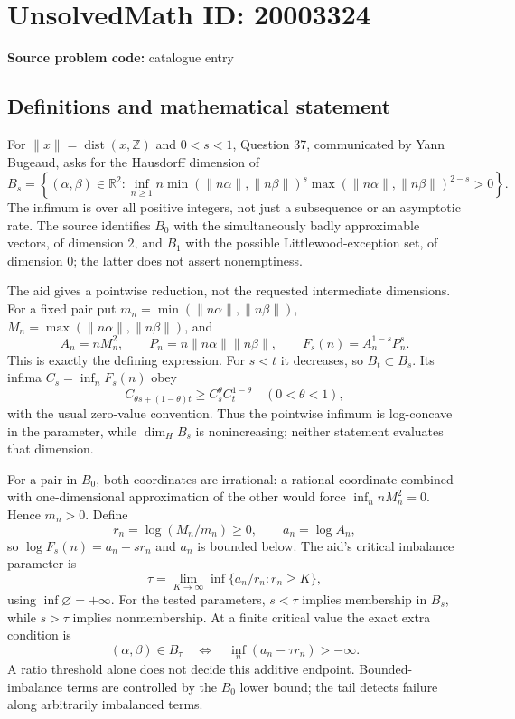 \documentclass[11pt]{article}
\newcommand{\Z}{\mathbb{Z}}
\newcommand{\R}{\mathbb{R}}
\begin{document}
\section*{UnsolvedMath ID: 20003324}
\textbf{Source problem code:} catalogue entry
\subsection{Definitions and mathematical statement}
For $\|x\|=\operatorname{dist}(x,\Z)$ and $0<s<1$, Question 37, communicated by Yann Bugeaud, asks for the Hausdorff dimension of
\[
 B_s=\left\{(\alpha,\beta)\in\R^2:
 \inf_{n\geq1}n\min(\|n\alpha\|,\|n\beta\|)^s
                  \max(\|n\alpha\|,\|n\beta\|)^{2-s}>0\right\}.
\]
The infimum is over all positive integers, not just a subsequence or an asymptotic rate. The source identifies $B_0$ with the simultaneously badly approximable vectors, of dimension $2$, and $B_1$ with the possible Littlewood-exception set, of dimension $0$; the latter does not assert nonemptiness.

The aid gives a pointwise reduction, not the requested intermediate dimensions. For a fixed pair put $m_n=\min(\|n\alpha\|,\|n\beta\|)$, $M_n=\max(\|n\alpha\|,\|n\beta\|)$, and
\[
 A_n=nM_n^2,\qquad P_n=n\|n\alpha\|\|n\beta\|,\qquad
 F_s(n)=A_n^{1-s}P_n^s.
\]
This is exactly the defining expression. For $s<t$ it decreases, so $B_t\subset B_s$. Its infima $C_s=\inf_nF_s(n)$ obey
\[
 C_{\theta s+(1-\theta)t}\geq C_s^\theta C_t^{1-\theta}
       \quad(0<\theta<1),
\]
with the usual zero-value convention. Thus the pointwise infimum is log-concave in the parameter, while $\dim_HB_s$ is nonincreasing; neither statement evaluates that dimension.

For a pair in $B_0$, both coordinates are irrational: a rational coordinate combined with one-dimensional approximation of the other would force $\inf_n nM_n^2=0$. Hence $m_n>0$. Define
\[
 r_n=\log(M_n/m_n)\geq0,\qquad a_n=\log A_n,
\]
so $\log F_s(n)=a_n-sr_n$ and $a_n$ is bounded below. The aid's critical imbalance parameter is
\[
 \tau=\lim_{K\to\infty}\inf\{a_n/r_n:r_n\geq K\},
\]
using $\inf\varnothing=+\infty$. For the tested parameters, $s<\tau$ implies membership in $B_s$, while $s>\tau$ implies nonmembership. At a finite critical value the exact extra condition is
\[
 (\alpha,\beta)\in B_\tau
       \quad\Longleftrightarrow\quad
 \inf_n(a_n-\tau r_n)>-\infty.
\]
A ratio threshold alone does not decide this additive endpoint. Bounded-imbalance terms are controlled by the $B_0$ lower bound; the tail detects failure along arbitrarily imbalanced terms.
\end{document}
